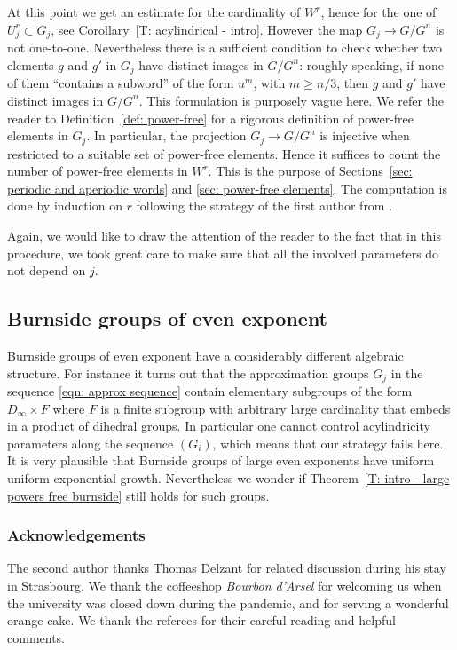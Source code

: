 \documentclass[11pt]{article}
\theoremstyle{plain}
\theoremstyle{definition}
\begin{document}
At this point we get an estimate for the cardinality of $W^r$, hence for the one of $U_j^r\subset G_j$, see Corollary~\ref{T: acylindrical - intro}.
However the map $G_j \to G/G^n$ is not one-to-one.
Nevertheless there is a sufficient condition to check whether two elements $g$ and $g'$ in $G_j$ have distinct images in $G/G^n$: roughly speaking, if none of them ``contains a subword'' of the form $u^m$, with $m \geq n/3$, then $g$ and $g'$ have distinct images in $G/G^n$.
This formulation is purposely vague here.
We refer the reader to Definition~\ref{def: power-free} for a rigorous definition of power-free elements in $G_j$.
In particular, the projection $G_j \to G/G^n$ is injective when restricted to a suitable set of power-free elements.
Hence it suffices to count the number of power-free elements in $W^r$.
This is the purpose of Sections~\ref{sec: periodic and aperiodic words} and \ref{sec: power-free elements}.
The computation is done by induction on $r$ following the strategy of the first author from \cite{coulon_growth_2013}.

Again, we would like to draw the attention of the reader to the fact that in this procedure, we took great care to make sure that all the involved parameters do not depend on $j$.

\subsection{Burnside groups of even exponent}
\label{sec: discussion-even-exp}
Burnside groups of even exponent have a considerably different algebraic structure.
For instance it turns out that the approximation groups $G_j$ in the sequence \eqref{eqn: approx sequence} contain elementary subgroups of the form $D_\infty \times F$ where $F$ is a finite subgroup with arbitrary large cardinality that embeds in a product of dihedral groups.
In particular one cannot control acylindricity parameters along the sequence $(G_i)$, which means that our strategy fails here.
It is very plausible that Burnside groups of large even exponents have uniform uniform exponential growth.
Nevertheless we wonder if Theorem~\ref{T: intro - large powers free burnside} still holds for such groups.

\subsubsection*{Acknowledgements}
The second author thanks Thomas Delzant for related discussion during his stay in Strasbourg. We thank the coffeeshop \emph{Bourbon d'Arsel} for welcoming us when the university was closed down during the pandemic, and for serving a wonderful orange cake. We thank the referees for their careful reading and helpful comments.
\end{document}

